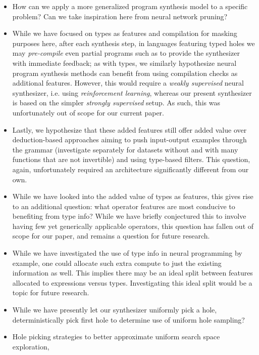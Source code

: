 \documentclass{article}
\begin{document}
\begin{itemize}
    \item How can we apply a more generalized program synthesis model to a specific problem?
    Can we take inspiration here from neural network pruning?
    \item While we have focused on types as features and compilation for masking purposes here,
    after each synthesis step,
    in languages featuring typed holes we may \emph{pre-compile} even partial programs such as to provide the synthesizer with immediate feedback;
    as with types, we similarly hypothesize neural program synthesis methods can benefit from using compilation checks as additional features.
    However, this would require a \emph{weakly supervised} neural synthesizer,
    i.e. using \emph{reinforcement learning},
    whereas our present synthesizer is based on the simpler \emph{strongly supervised} setup.
    As such, this was unfortunately out of scope for our current paper.
    \item Lastly, we hypothesize that these added features still offer added value over
    deduction-based approaches aiming to push input-output examples through the grammar
    (investigate separately for datasets without and with many functions that are not invertible)
    and using type-based filters.
    This question, again, unfortunately required an architecture significantly different from our own.
    \item While we have looked into the added value of types as features,
    this gives rise to an additional question:
    what operator features are most conducive to benefiting from type info?
    While we have briefly conjectured this to involve having few yet generically applicable operators,
    this question has fallen out of scope for our paper,
    and remains a question for future research.
    \item While we have investigated the use of type info in neural programming by example,
    one could allocate such extra compute to just the existing information as well.
    This implies there may be an ideal split between features allocated to expressions versus types.
    Investigating this ideal split would be a topic for future research.
    \item While we have presently let our synthesizer uniformly pick a hole, deterministically pick first hole to determine use of uniform hole sampling?
    \item Hole picking strategies to better approximate uniform search space exploration,

\end{itemize}
\end{document}
